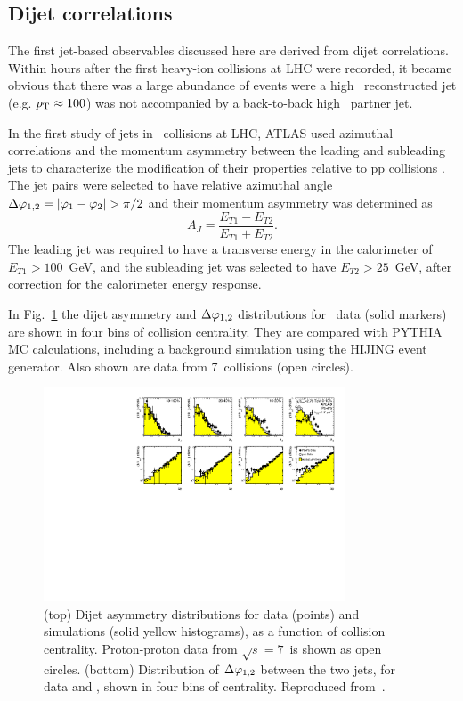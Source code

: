 \subsection{Dijet correlations}

The first jet-based observables discussed here are derived from dijet correlations. Within hours
after the first heavy-ion collisions at LHC were recorded, it became obvious that there was
a large abundance of events were a high \pT\ reconstructed jet (e.g. $\mbox{$p_{\mathrm{T}}$} \approx 100$\GeVc) was
not accompanied by a back-to-back high \pT\ partner jet.

In the first study of jets in \PbPb\ collisions at LHC, ATLAS used azimuthal correlations and the
momentum asymmetry between the leading and subleading jets to characterize the modification
of their properties relative to pp collisions \cite{Aad:2010bu}.
The jet pairs were selected to have relative azimuthal angle $\Delta\varphi_{1,2} =|\varphi_1-\varphi_2| > \pi/2$
and their momentum asymmetry was determined as
\begin{equation}
A_J = \frac{E_{T1}-E_{T2}}{E_{T1}+E_{T2}}.
\end{equation}
The leading jet was required to have a transverse energy in the calorimeter of $E_{T1} > 100$~GeV,
and the subleading jet was selected to have $E_{T2} > 25$~GeV, after correction for
the calorimeter energy response.

In Fig.~\ref{fig:GR:final_4x2} the dijet asymmetry and $\Delta\varphi_{1,2}$ distributions 
for \PbPb\ data (solid markers)
are shown in four bins of collision centrality. They are compared with PYTHIA MC calculations, including a
background simulation using the HIJING event generator. Also shown are data from 7\TeV\
\pp collisions (open circles).
\begin{figure}[!thb]
\begin{center}
\includegraphics[width=0.8\textwidth]{jetfigures/final_4x2_23_newpp.pdf}
\caption{
(top) Dijet asymmetry distributions for data (points) and  
simulations (solid yellow histograms), as a function of collision centrality.  
Proton-proton data from $\sqrt{s}=7$\TeV\ is shown as open circles.
(bottom) Distribution of $\Delta\varphi_{1,2}$ between the two jets, 
for data and , shown in four bins of centrality.
Reproduced from~\cite{Aad:2010bu}.}
\label{fig:GR:final_4x2}
\end{center}
\end{figure}

